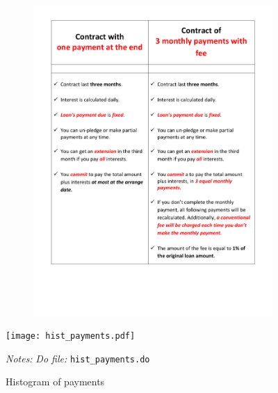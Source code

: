 \documentclass[11pt]{article}
\begin{document}
\begin{figure}[H]
     \caption{Booklet: Choice days}
    \label{booklet_translate}
    \begin{center}
    \begin{subfigure}{0.8\textwidth}
        \centering
        \includegraphics[width=\textwidth]{Figuras/MP_2.pdf}
    \end{subfigure}
    \end{center}
\end{figure}



\begin{figure}[H]
        \caption{Histogram of payments}
    \label{HistPayments}
    \begin{center}
        \centering
        \texttt{[image: hist\_payments.pdf]}
    \end{center}
     \footnotesize \textit{Notes: } 
      \footnotesize{ \textit{Do file: }  \texttt{hist\_payments.do}}
\end{figure}
\end{document}
